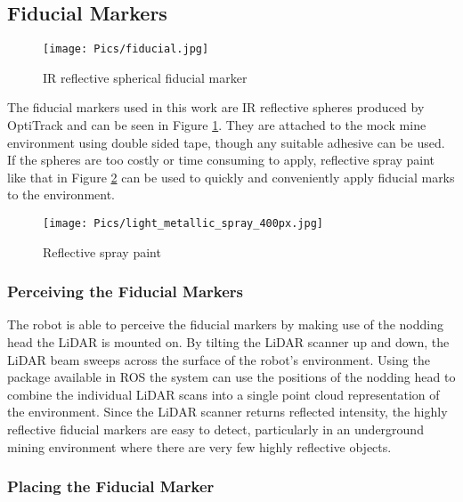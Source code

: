 \subsection{Fiducial Markers}

\begin{figure}
    \centering
    \texttt{[image: Pics/fiducial.jpg]}
    \caption{IR reflective spherical fiducial marker}
    \label{fig:fiducial}
\end{figure}

The fiducial markers used in this work are IR reflective spheres produced by OptiTrack and can be seen in Figure \ref{fig:fiducial}. They are attached to the mock mine environment using double sided tape, though any suitable adhesive can be used. If the spheres are too costly or time consuming to apply, reflective spray paint like that in Figure \ref{fig:irspray} can be used to quickly and conveniently apply fiducial marks to the environment.\\

\begin{figure}
    \centering
    \texttt{[image: Pics/light\_metallic\_spray\_400px.jpg]}
    \caption{Reflective spray paint \cite{spraypaint}}
    \label{fig:irspray}
\end{figure}

\subsubsection{Perceiving the Fiducial Markers}

The robot is able to perceive the fiducial markers by making use of the nodding head the LiDAR is mounted on. By tilting the LiDAR scanner up and down, the LiDAR beam sweeps across the surface of the robot's environment. Using the  package available in ROS the system can use the positions of the nodding head to combine the individual LiDAR scans into a single point cloud representation of the environment. Since the LiDAR scanner returns reflected intensity, the highly reflective fiducial markers are easy to detect, particularly in an underground mining environment where there are very few highly reflective objects.\\

\subsubsection{Placing the Fiducial Marker}

